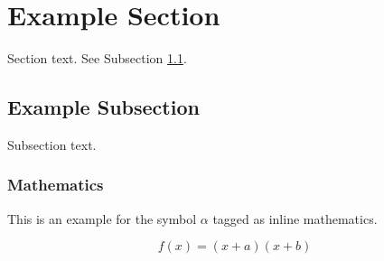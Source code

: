 \documentclass[authoryear,preprint,12pt,3p]{elsarticle}
\begin{document}


\section{Example Section}
\label{sec1}

Section text. See Subsection \ref{subsec1}.

\subsection{Example Subsection}
\label{subsec1}

Subsection text.


\subsubsection{Mathematics}
This is an example for the symbol $\alpha$ tagged as inline mathematics.

\begin{equation}
f(x) = (x+a)(x+b)
\end{equation}
\end{document}
